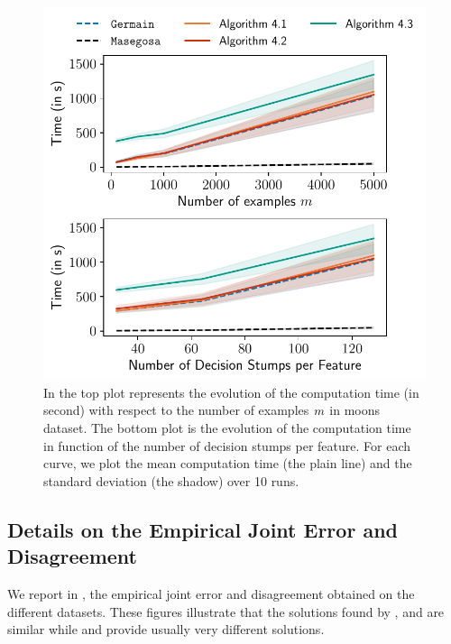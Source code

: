 \begin{noaddcontents}
\begin{figure}
    \centering
    \includegraphics[width=0.9\linewidth]{chapter_4/figures/moons_time.pdf}
    \caption{
    In the top plot represents the evolution of the computation time (in second) with respect to the number of examples $m$ in moons dataset.
    The bottom plot is the evolution of the computation time in function of the number of decision stumps per feature. 
    For each curve, we plot the mean computation time (the plain line) and the standard deviation (the shadow) over 10 runs.
    }
    \label{chap:mv:fig:moons-time}
\end{figure}

\subsection{Details on the Empirical Joint Error and Disagreement}
\label{ap:mv:sec:joint-disa}

We report in , the empirical joint error and disagreement obtained on the different datasets.
These figures illustrate that the solutions found by , \algomasegosa and \cbboost are similar while \mincq and \algogermain provide usually very different solutions.


\end{noaddcontents}
